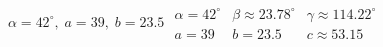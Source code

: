 { $\alpha = 42^{\circ}, \; a = 39, \; b = 23.5$}
{$\begin{array}{lll}\alpha = 42^{\circ} & \beta \approx 23.78^{\circ} & \gamma \approx 114.22^{\circ} \\a = 39 & b = 23.5 & c \approx 53.15 \end{array}$}
